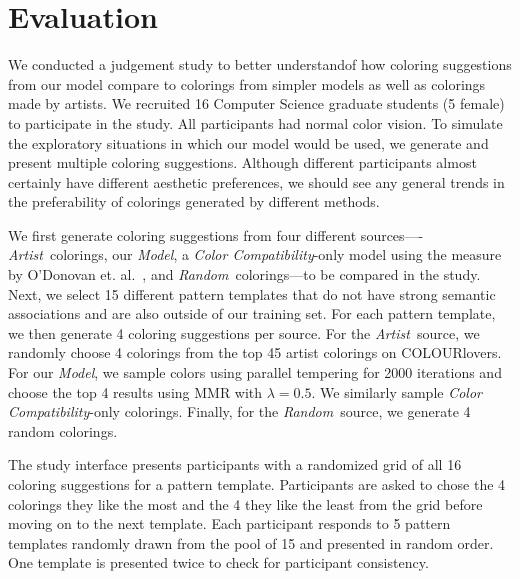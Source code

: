 \section{Evaluation}
\label{sec:evaluation}

We conducted a judgement study to better understandof how coloring suggestions from our model compare to colorings from simpler models as well as colorings made by artists. We recruited 16 Computer Science graduate students (5 female) to participate in the study. All participants had normal color vision. To simulate the exploratory situations in which our model would be used, we generate and present multiple coloring suggestions. Although different participants almost certainly have different aesthetic preferences, we should see any general trends in the preferability of colorings generated by different methods. 

\newcommand{\artistSource}{\emph{Artist}}
\newcommand{\modelSource}{\emph{Model}}
\newcommand{\compatSource}{\emph{Color Compatibility}}
\newcommand{\randomSource}{\emph{Random}}
We first generate coloring suggestions from four different sources----\artistSource~colorings, our \modelSource, a \compatSource-only model using the measure by O'Donovan et. al.~, and \randomSource~colorings---to be compared in the study. Next, we select 15 different pattern templates that do not have strong semantic associations and are also outside of our training set. For each pattern template, we then generate 4 coloring suggestions per source. For the \artistSource~source, we randomly choose 4 colorings from the top 45 artist colorings on COLOURlovers. For our \modelSource, we sample colors using parallel tempering for 2000 iterations and choose the top 4 results using MMR with $\lambda = 0.5$. We similarly sample \compatSource-only colorings. Finally, for the \randomSource~source, we generate 4 random colorings.

The study interface presents participants with a randomized grid of all 16 coloring suggestions for a pattern template. Participants are asked to chose the 4 colorings they like the most and the 4 they like the least from the grid before moving on to the next template. Each participant responds to 5 pattern templates randomly drawn from the pool of 15 and presented in random order. One template is presented twice to check for participant consistency.

